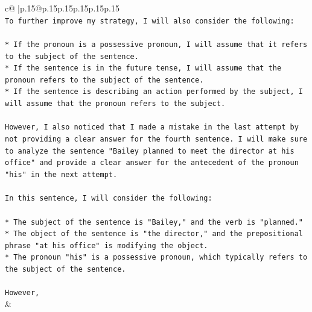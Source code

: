 \documentclass{article}
\begin{document}
{\begin{supertabular}{c@{$\;$}|p{.15\linewidth}@{}p{.15\linewidth}p{.15\linewidth}p{.15\linewidth}p{.15\linewidth}p{.15\linewidth}}
{{{\\ 
\texttt{To further improve my strategy, I will also consider the following:} \\
\\ 
\texttt{* If the pronoun is a possessive pronoun, I will assume that it refers to the subject of the sentence.} \\
\texttt{* If the sentence is in the future tense, I will assume that the pronoun refers to the subject of the sentence.} \\
\texttt{* If the sentence is describing an action performed by the subject, I will assume that the pronoun refers to the subject.} \\
\\ 
\texttt{However, I also noticed that I made a mistake in the last attempt by not providing a clear answer for the fourth sentence. I will make sure to analyze the sentence "Bailey planned to meet the director at his office" and provide a clear answer for the antecedent of the pronoun "his" in the next attempt.} \\
\\ 
\texttt{In this sentence, I will consider the following:} \\
\\ 
\texttt{* The subject of the sentence is "Bailey," and the verb is "planned."} \\
\texttt{* The object of the sentence is "the director," and the prepositional phrase "at his office" is modifying the object.} \\
\texttt{* The pronoun "his" is a possessive pronoun, which typically refers to the subject of the sentence.} \\
\\ 
\texttt{However,} \\
            }
        }
    }
    & \\ \\

\end{supertabular}
}
\end{document}
